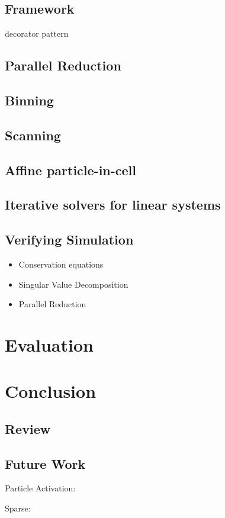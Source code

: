 \documentclass[m,times]{cgMA}
\begin{document}
\subsection{Framework}
decorator pattern
\subsection{Parallel Reduction}
\cite{NVIDIA:PARALLEL_REDUCTION}
\subsection{Binning}
\cite{NVIDIA:BINNING}
\subsection{Scanning}
\cite{NVIDIA:SCAN}
\cite{NVIDIA:SCAN_MODERN}
\subsection{Affine particle-in-cell}
\cite{MPM:APIC}
\subsection{Iterative solvers for linear systems}
\subsection{Verifying Simulation}
\begin{itemize}
  \item Conservation equations
  \item Singular Value Decomposition
  \item Parallel Reduction
\end{itemize}
\section{Evaluation}
\cite{NVIDIA:PEAK_PERFORMANCE}
\cite{KHRONOS:TIMER_QUERY}
\section{Conclusion}
\subsection{Review}
\subsection{Future Work}
Particle Activation: \cite{MPM:GPU}

Sparse: \cite{OPENVDB} \cite{NVIDIA:GVDB_VOXELS}

\listoffigures
\clearpage
\listoftables
\lstlistoflistings
\clearpage
{}
\printbibliography
\end{document}
